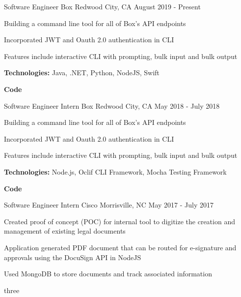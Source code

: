 
\begin{cventries}
  \cventry
    {Software Engineer} %
    {Box} %
    {Redwood City, CA} %
    {August 2019 - Present} %
    {
      \begin{cvitems} %
        \item{Building a command line tool for all of Box’s API endpoints}
        \item{Incorporated JWT and Oauth 2.0 authentication in CLI}
        \item{Features include interactive CLI with prompting, bulk input and bulk output}
        {\setlength \itemindent{-2ex} \itemsep2pt \item[] \textbf{Technologies:} Java, .NET, Python, NodeJS, Swift}
        {\setlength \itemindent{-2ex} \itemsep2pt \item[] \textbf{Code} }
      \end{cvitems}
    }
    
  \cventry
    {Software Engineer Intern} %
    {Box} %
    {Redwood City, CA} %
    {May 2018 - July 2018} %
    {
      \begin{cvitems} %
        \item{Building a command line tool for all of Box’s API endpoints}
        \item{Incorporated JWT and Oauth 2.0 authentication in CLI}
        \item{Features include interactive CLI with prompting, bulk input and bulk output}
        {\setlength \itemindent{-2ex} \itemsep2pt \item[] \textbf{Technologies:} Node.js, Oclif CLI Framework, Mocha Testing Framework}
        {\setlength \itemindent{-2ex} \itemsep2pt \item[] \textbf{Code} }
      \end{cvitems}
    }

  \cventry
    {Software Engineer Intern} %
    {Cisco} %
    {Morrisville, NC} %
    {May 2017 - July 2017} %
    {
      \begin{cvitems} %
        \item{Created proof of concept (POC) for internal tool to digitize the creation and management of existing legal documents}
        \item{Application generated PDF document that can be routed for e-signature and approvals using the DocuSign API in NodeJS}
        \item {Used MongoDB to store documents and track associated information}
        {\setlength\itemindent{-2ex} \item[] three}
      \end{cvitems}
    }
    

\end{cventries}
